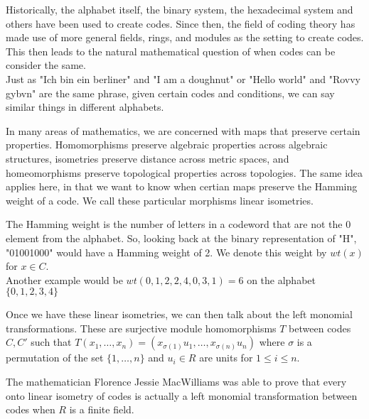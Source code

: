 \documentclass{beamer}
\begin{document}
\begin{frame}

    Historically, the alphabet itself, the binary system, the hexadecimal system and others have been
    used to create codes. Since then, the field of coding theory has made use of more general fields,
    rings, and modules as the setting to create codes.\\
    This then leads to the natural mathematical question of when codes can be consider the same.\\ %
    Just as "Ich bin ein berliner" and "I am a doughnut" or "Hello world" and "Rovvy gybvn" are the
    same phrase, given certain codes and conditions, we can say similar things in different alphabets.
    
\end{frame}

\begin{frame}
    
    In many areas of mathematics, we are concerned with maps that preserve certain properties.
    Homomorphisms preserve algebraic properties across algebraic structures, isometries preserve
    distance across metric spaces, and homeomorphisms preserve topological properties across topologies.
    The same idea applies here, in that we want to know when certian maps preserve the Hamming weight of
    a code. We call these particular morphisms linear isometries. %

\end{frame}

\begin{frame}
    
    The Hamming weight is the number of letters in a codeword that are not the $0$ element from the
    alphabet. So, looking back at the binary representation of "H", "01001000" would have a Hamming
    weight of 2. We denote this weight by $wt(x)$ for $x\in C$.\\
    Another example would be $wt(0,1,2,2,4,0,3,1)=6$ on the alphabet $\{0,1,2,3,4\}$

\end{frame}

\begin{frame}
    
    Once we have these linear isometries, we can then talk about the left monomial transformations.
    These are surjective module homomorphisms $T$ between codes $C,C'$ such that
    $T(x_1,\ldots,x_n)=(x_{\sigma(1)}u_1,\ldots,x_{\sigma(n)}u_n)$ where $\sigma$ is a permutation of
    the set $\{1,\ldots,n\}$ and $u_i\in R$ are units for $1\leq i\leq n$.

\end{frame}

\begin{frame}
    
    The mathematician Florence Jessie MacWilliams was able to prove that every onto linear isometry of
    codes is actually a left monomial transformation between codes when $R$ is a finite field.

\end{frame}
\end{document}
